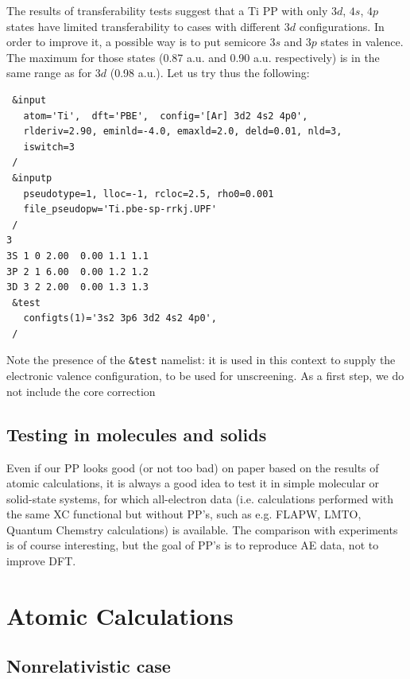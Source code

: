 \documentclass[12pt,a4paper]{article}
\begin{document}
The results of transferability tests suggest that a Ti PP with only
$3d$, $4s$, $4p$ states have limited transferability to cases with 
different $3d$ configurations. In order to improve it, a possible
way is to put semicore $3s$ and $3p$ states in valence. The maximum
for those states (0.87 a.u. and 0.90 a.u. respectively) is in the 
same range as for $3d$ (0.98 a.u.). Let us try thus the following:
\begin{verbatim}
 &input
   atom='Ti',  dft='PBE',  config='[Ar] 3d2 4s2 4p0',
   rlderiv=2.90, eminld=-4.0, emaxld=2.0, deld=0.01, nld=3,
   iswitch=3
 /
 &inputp
   pseudotype=1, lloc=-1, rcloc=2.5, rho0=0.001
   file_pseudopw='Ti.pbe-sp-rrkj.UPF'
 /
3
3S 1 0 2.00  0.00 1.1 1.1
3P 2 1 6.00  0.00 1.2 1.2
3D 3 2 2.00  0.00 1.3 1.3
 &test
   configts(1)='3s2 3p6 3d2 4s2 4p0',
 /
\end{verbatim}
Note the presence of the \texttt{\&test} namelist: it is used in this
context to supply the electronic valence configuration, to be used
for unscreening. As a first step, we do not include the core correction

\newpage
\subsection{Testing in molecules and solids}

Even if our PP looks good
(or not too bad) on paper based on the results of atomic calculations,
it is always a good idea to test it in simple molecular or solid-state
systems, for which all-electron data (i.e. calculations performed with
the same XC functional but without PP's, such as e.g. FLAPW, LMTO,
Quantum Chemstry calculations) is available. The comparison with
experiments is of course interesting, but the goal of PP's is to 
reproduce AE data, not to improve DFT.


\appendix

\section{Atomic Calculations}

\subsection{Nonrelativistic case}
\end{document}
